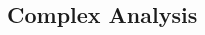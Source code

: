 \newpage
\begin{multicols}{2}

    \begin{CheatsheetEntryFrame}



    \end{CheatsheetEntryFrame}
    
\end{multicols}


\newpage
\subsection{Complex Analysis}%
\label{sub:complex-analysis}

